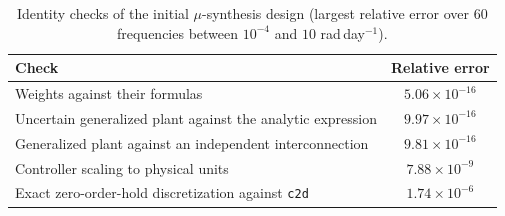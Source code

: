 \begin{table}[htbp]
\centering
\caption{Identity checks of the initial $\mu$-synthesis design (largest relative error over 60 frequencies between $10^{-4}$ and $10$ rad\,day$^{-1}$).}
\label{tab:mu_verification}
\small
\begin{tabular}{lc}
\toprule
Check & Relative error \\
\midrule
Weights against their formulas & $5.06{\times}10^{-16}$ \\
Uncertain generalized plant against the analytic expression & $9.97{\times}10^{-16}$ \\
Generalized plant against an independent interconnection & $9.81{\times}10^{-16}$ \\
Controller scaling to physical units & $7.88{\times}10^{-9}$ \\
Exact zero-order-hold discretization against \texttt{c2d} & $1.74{\times}10^{-6}$ \\
\bottomrule
\end{tabular}
\end{table}
